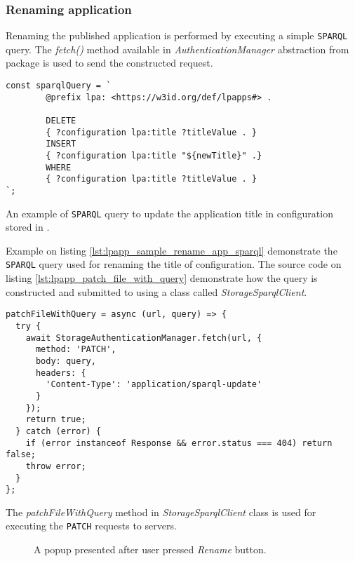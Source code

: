 \subsubsection{Renaming application}

Renaming the published application is performed by executing a simple \texttt{SPARQL} query. The \textit{fetch()} method available in \textit{AuthenticationManager} abstraction from \lpas{} package is used to send the constructed request. 

\begin{listing}[H]    
\begin{verbatim}
const sparqlQuery = `
        @prefix lpa: <https://w3id.org/def/lpapps#> .

        DELETE
        { ?configuration lpa:title ?titleValue . }
        INSERT
        { ?configuration lpa:title "${newTitle}" .}
        WHERE
        { ?configuration lpa:title ?titleValue . }
`;
\end{verbatim}
\caption{An example of \texttt{SPARQL} query to update the application title in configuration stored in \solid{}.} 
\label{lst:lpapp_sample_rename_app_sparql}
\end{listing}

Example on listing \autoref{lst:lpapp_sample_rename_app_sparql} demonstrate the \texttt{SPARQL} query used for renaming the title of \lpa{} configuration. The source code on listing \autoref{lst:lpapp_patch_file_with_query} demonstrate how the query is constructed and submitted to \solid{} using a class called \textit{StorageSparqlClient}.

\begin{listing}[H]    
\begin{verbatim}
patchFileWithQuery = async (url, query) => {
  try {
    await StorageAuthenticationManager.fetch(url, {
      method: 'PATCH',
      body: query,
      headers: {
        'Content-Type': 'application/sparql-update'
      }
    });
    return true;
  } catch (error) {
    if (error instanceof Response && error.status === 404) return false;
    throw error;
  }
};
\end{verbatim}
\caption{The \textit{patchFileWithQuery} method in \textit{StorageSparqlClient} class is used for executing the \texttt{PATCH} requests to \solid{} servers.} 
\label{lst:lpapp_patch_file_with_query}
\end{listing}

\begin{figure}[h]
\centering
{}
\caption{A popup presented after user pressed \textit{Rename} button.}
\label{fig:lpa_rename_visualzer}
\end{figure}

